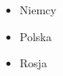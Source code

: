 \documentclass [12pt] {article}
\begin{document}
\noindent
\begin{itemize}
  \item Niemcy
  \item Polska
	\item Rosja
\end{itemize}
\end{document}
